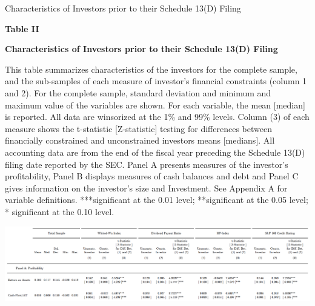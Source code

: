 \documentclass[12pt]{article}
\begin{document}
%
\begin{table}
	\centering
	\captionsetup{textformat=empty,labelformat=blank}
	\caption{Characteristics of Investors prior to their Schedule 13(D) Filing}
	\textbf{Table II}\par\medskip
	\large\textbf{Characteristics of Investors prior to their Schedule 13(D) Filing\\}\par\medskip
	\justifying
	\footnotesize\noindent{}This table summarizes characteristics of the investors for the complete sample, and the sub-samples of each measure of investor's financial constraints (column 1 and 2). For the complete sample,  standard deviation and minimum and maximum value of the variables are shown. For each variable, the mean [median] is reported. All data are winsorized at the 1\% and 99\% levels. Column (3) of each measure shows the t-statistic [Z-statistic] testing for differences between financially constrained and unconstrained investors means [medians]. All accounting data are from the end of the fiscal year preceding the Schedule 13(D) filing date reported by the SEC. Panel A presents measures of the investor's profitability, Panel B displays  measures of cash balances and debt and Panel C gives information on the investor's size and Investment. See Appendix A for variable definitions. ***significant at the 0.01 level; **significant at the 0.05 level; * significant at the 0.10 level.\par\medskip
	\centering													
	\begin{adjustbox}{width=\textwidth}
		\includegraphics{Summary1}
	\end{adjustbox}\par\medskip
\end{table}
\end{document}
